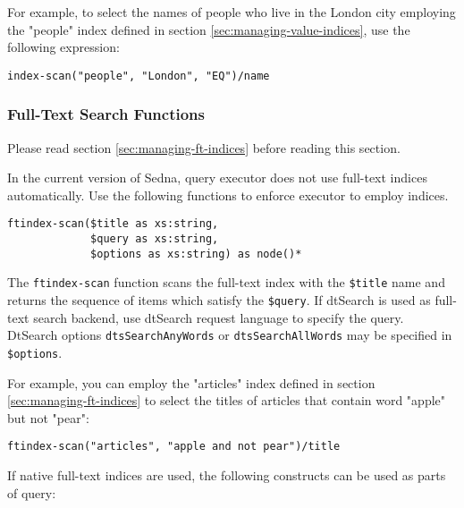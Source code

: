 \documentclass[a4paper,12pt]{article}
\begin{document}
For example, to select the names of people who live in the London city employing
the "people" index defined in section \ref{sec:managing-value-indices}, use the
following expression:

\begin{verbatim}
index-scan("people", "London", "EQ")/name
\end{verbatim}


\subsubsection{Full-Text Search Functions}
\label{sec:ft-fun}

Please read section \ref{sec:managing-ft-indices} before reading this section.

In the current version of Sedna, query executor does not use full-text indices
automatically. Use the following functions to enforce executor to employ
indices.

\begin{verbatim}
ftindex-scan($title as xs:string,
             $query as xs:string,
             $options as xs:string) as node()*
\end{verbatim}

The \verb!ftindex-scan! function scans the full-text index with the
\verb!$title! name and returns the sequence of items which satisfy the
\verb!$query!. If dtSearch \cite{link:dtsearch-engine} is used as full-text
search backend, use dtSearch request language \cite{doc:dtsearch} to specify the
query. DtSearch options \verb!dtsSearchAnyWords! or \verb!dtsSearchAllWords! may
be specified in \verb!$options!.

For example, you can employ the "articles" index defined in section
\ref{sec:managing-ft-indices} to select the titles of articles that contain word
"apple" but not "pear":

\begin{verbatim}
ftindex-scan("articles", "apple and not pear")/title
\end{verbatim}

If native full-text indices are used, the following constructs can be used as
parts of query:
\end{document}
